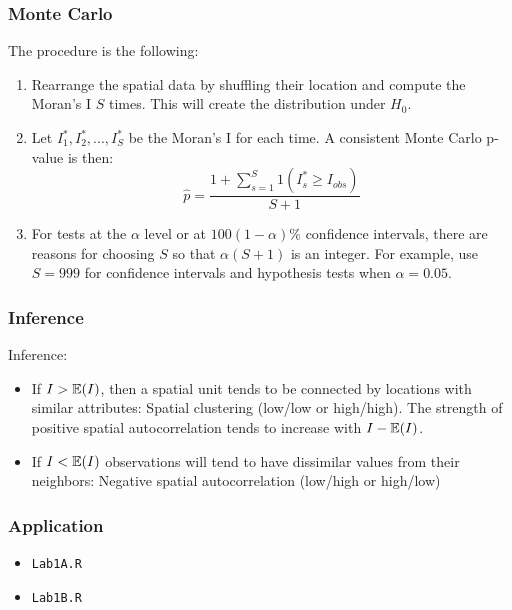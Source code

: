 \documentclass[english,10pt]{beamer}\usepackage[]{graphicx}\usepackage[]{xcolor}
\makeatletter
\newcommand\code{\bgroup\@makeother\_\@makeother\~\@makeother\$\@codex}
\def\@codex#1{{\normalfont\ttfamily\hyphenchar\font=-1 #1}\egroup}
\let\code=\texttt
\makeatother
\begin{document}
\begin{frame}
  \frametitle{Monte Carlo}
  \begin{theorem}
The procedure is the following:

\begin{enumerate}
\item Rearrange the spatial data by shuffling their location and compute the Moran's I $S$ times. This will create the distribution under $H_0$.
\item Let $I_1^*, I_2^*,..., I_S^*$ be the Moran's I for each time. A consistent Monte Carlo p-value is then:
  \begin{equation}
    \widehat{p} = \frac{1 + \sum_{s=1}^S 1(I^*_s \geq I_{obs})}{S + 1}
  \end{equation}
  \item For tests at the $\alpha$ level or at $100(1- \alpha)\%$ confidence intervals, there are reasons for choosing $S$ so that $\alpha(S + 1)$ is an integer. For example, use $S=999$ for confidence intervals and hypothesis tests when $\alpha = 0.05$.
\end{enumerate}
\end{theorem}
\end{frame}

\begin{frame}
  \frametitle{Inference}
  Inference:
    \begin{itemize}
      \item If $I > \mathbb{E}(I)$, then a spatial unit tends to be connected by locations with similar attributes: Spatial clustering (low/low or high/high). The strength of positive spatial autocorrelation tends to increase with $I-\mathbb{E}(I)$.
      \item If $I < \mathbb{E}(I)$ observations will tend to have dissimilar values from their neighbors: Negative spatial autocorrelation (low/high or high/low)
    \end{itemize}
\end{frame}

\begin{frame}
  \frametitle{Application}
    \begin{itemize}
      \item \code{Lab1A.R}
      \item \code{Lab1B.R}
    \end{itemize}
\end{frame}
\end{document}

